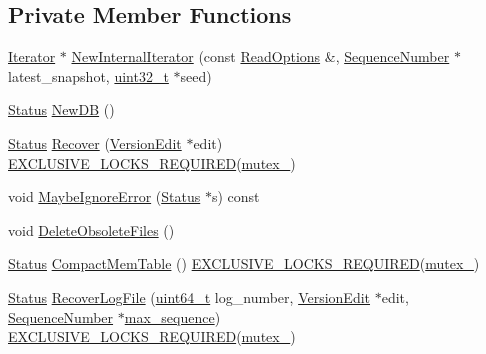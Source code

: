 \subsection*{Private Member Functions}
\begin{DoxyCompactItemize}
\item 
\hyperlink{classleveldb_1_1_iterator}{Iterator} $\ast$ \hyperlink{classleveldb_1_1_d_b_impl_a49b0e6bbb2eaaa17b0869dc4d4fce49d}{New\-Internal\-Iterator} (const \hyperlink{structleveldb_1_1_read_options}{Read\-Options} \&, \hyperlink{namespaceleveldb_a5481ededd221c36d652c371249f869fa}{Sequence\-Number} $\ast$latest\-\_\-snapshot, \hyperlink{stdint_8h_a435d1572bf3f880d55459d9805097f62}{uint32\-\_\-t} $\ast$seed)
\item 
\hyperlink{classleveldb_1_1_status}{Status} \hyperlink{classleveldb_1_1_d_b_impl_acfd8ee23923b6a2afb3016831d751b9b}{New\-D\-B} ()
\item 
\hyperlink{classleveldb_1_1_status}{Status} \hyperlink{classleveldb_1_1_d_b_impl_aa9a573026c03e8485471f583316943b0}{Recover} (\hyperlink{classleveldb_1_1_version_edit}{Version\-Edit} $\ast$edit) \hyperlink{thread__annotations_8h_a0e2e86b0f11d9778240b0a0b263047b1}{E\-X\-C\-L\-U\-S\-I\-V\-E\-\_\-\-L\-O\-C\-K\-S\-\_\-\-R\-E\-Q\-U\-I\-R\-E\-D}(\hyperlink{classleveldb_1_1_d_b_impl_ac591585d5dea970b4bd1beb7553ce197}{mutex\-\_\-})
\item 
void \hyperlink{classleveldb_1_1_d_b_impl_ac957f408efe2e4a110ef3e45760bd5bf}{Maybe\-Ignore\-Error} (\hyperlink{classleveldb_1_1_status}{Status} $\ast$s) const 
\item 
void \hyperlink{classleveldb_1_1_d_b_impl_a193cbda79a60ec9d3b83991cf7be91cf}{Delete\-Obsolete\-Files} ()
\item 
\hyperlink{classleveldb_1_1_status}{Status} \hyperlink{classleveldb_1_1_d_b_impl_affe08e583b60dc854760d60f63db9364}{Compact\-Mem\-Table} () \hyperlink{thread__annotations_8h_a0e2e86b0f11d9778240b0a0b263047b1}{E\-X\-C\-L\-U\-S\-I\-V\-E\-\_\-\-L\-O\-C\-K\-S\-\_\-\-R\-E\-Q\-U\-I\-R\-E\-D}(\hyperlink{classleveldb_1_1_d_b_impl_ac591585d5dea970b4bd1beb7553ce197}{mutex\-\_\-})
\item 
\hyperlink{classleveldb_1_1_status}{Status} \hyperlink{classleveldb_1_1_d_b_impl_ac9e2ce8c5013d78ba19e8417f94fdad8}{Recover\-Log\-File} (\hyperlink{stdint_8h_aaa5d1cd013383c889537491c3cfd9aad}{uint64\-\_\-t} log\-\_\-number, \hyperlink{classleveldb_1_1_version_edit}{Version\-Edit} $\ast$edit, \hyperlink{namespaceleveldb_a5481ededd221c36d652c371249f869fa}{Sequence\-Number} $\ast$\hyperlink{repair_8cc_a52c1b794512261f530db50c720acb0c4}{max\-\_\-sequence}) \hyperlink{thread__annotations_8h_a0e2e86b0f11d9778240b0a0b263047b1}{E\-X\-C\-L\-U\-S\-I\-V\-E\-\_\-\-L\-O\-C\-K\-S\-\_\-\-R\-E\-Q\-U\-I\-R\-E\-D}(\hyperlink{classleveldb_1_1_d_b_impl_ac591585d5dea970b4bd1beb7553ce197}{mutex\-\_\-})

\end{DoxyCompactItemize}
